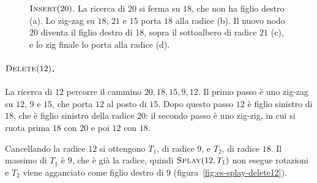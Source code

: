 \begin{figure}[htbp]
\caption{$\textsc{Insert}(20)$. La ricerca di $20$ si ferma su $18$, che non ha figlio destro (a). Lo zig-zag su $18$, $21$ e $15$ porta $18$ alla radice (b). Il nuovo nodo $20$ diventa il figlio destro di $18$, sopra il sottoalbero di radice $21$ (c), e lo zig finale lo porta alla radice (d).}
\label{fig:es-splay-insert20}
\end{figure}

\paragraph{$\textsc{Delete}(12)$.}
La ricerca di $12$ percorre il cammino $20, 18, 15, 9, 12$. Il primo passo è uno zig-zag su $12$, $9$ e $15$, che porta $12$ al posto di $15$. Dopo questo passo $12$ è figlio sinistro di $18$, che è figlio sinistro della radice $20$: il secondo passo è uno zig-zig, in cui si ruota prima $18$ con $20$ e poi $12$ con $18$.

Cancellando la radice $12$ si ottengono $T_1$, di radice $9$, e $T_2$, di radice $18$. Il massimo di $T_1$ è $9$, che è già la radice, quindi $\textsc{Splay}(12, T_1)$ non esegue rotazioni e $T_2$ viene agganciato come figlio destro di $9$ (figura~\ref{fig:es-splay-delete12}).

